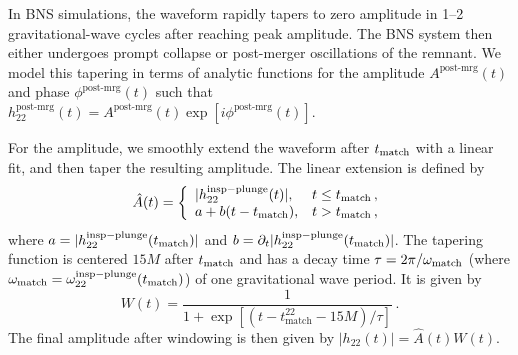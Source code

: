 \documentclass[prd,aps,letter,twocolumn,floatfix,notitlepage,nofootinbib]{revtex4-1}
\newcommand{\red}[1]{\textcolor{red}{#1}}
\begin{document}


In BNS simulations, the waveform rapidly tapers to zero amplitude in 1--2 gravitational-wave cycles after reaching peak amplitude. The BNS system then either undergoes prompt collapse or post-merger oscillations of the remnant. We model this tapering in terms of analytic functions for the amplitude $A^{\textrm{post-mrg}}(t)$ and phase $\phi^{\textrm{post-mrg}}(t)$ such that $h_{22}^{\textrm{post-mrg}}(t) = A^{\textrm{post-mrg}}(t) \exp{[i\phi^{\textrm{post-mrg}}(t)]}$. 

For the amplitude, we smoothly extend the waveform after $t_{\rm match}$ with a linear fit, and then taper the resulting amplitude. The linear extension is defined by
\begin{align}
\hat{A}(t)=\left\{\begin{array}{ll}
|h_{22}^{\rm insp-plunge}(t)|, & t \leq t_{\rm match}\,, \\
a + b (t - t_{\rm match}), & t > t_{\rm match}\,,
\end{array}\right.
\end{align}
where $a = |h_{22}^{\rm insp-plunge}(t_{\rm match})|$ and $b=\partial_t |h_{22}^{\rm insp-plunge}(t_{\rm match})|$. The tapering function is centered $15M$ after $t_{\rm match}$ and has a decay time $\tau = 2\pi / \omega_{\rm match}$ (where $\omega_{\rm match} = \omega_{22}^{\rm insp-plunge}(t_{\rm match})$) of one gravitational wave period. It is given by
\begin{equation}
W(t) = \frac{1}{1+\exp{[(t- t^{22}_{\textrm{match}}-15M)/\tau]}}\,.
\end{equation}
The final amplitude after windowing is then given by $|h_{22}(t)| = \hat A(t) W(t)$.
\end{document}

